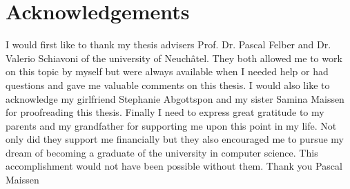 \chapter*{Acknowledgements}
I would first like to thank my thesis advisers Prof. Dr. Pascal Felber and Dr. Valerio Schiavoni of the university of Neuchâtel. They both allowed me to work on this topic by myself but were always available when I needed help or had questions and gave me valuable comments on this thesis.
\newline
\newline
I would also like to acknowledge my girlfriend Stephanie Abgottspon and my sister Samina Maissen for proofreading this thesis.
\newline
\newline
Finally I need to express great gratitude to my parents and my grandfather for supporting me upon this point in my life. Not only did they support me financially but they also encouraged me to pursue my dream of becoming a graduate of the university in computer science. This accomplishment would not have been possible without them.
\newline
\newline
Thank you
\newline
\newline
Pascal Maissen